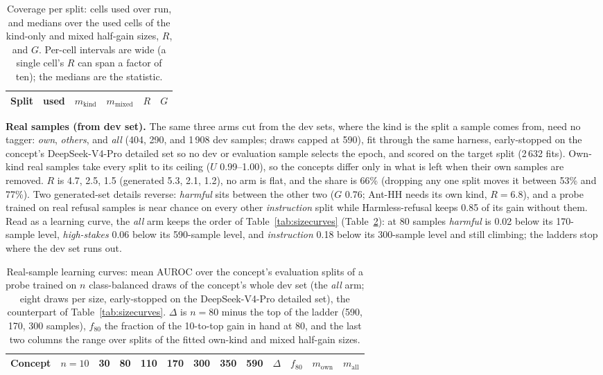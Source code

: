 \documentclass{article} %
\newcommand{\hs}{\emph{high-stakes}}
\newcommand{\harm}{\emph{harmful}}
\newcommand{\instr}{\emph{instruction}}
\begin{document}
\begin{table}[H]
  \caption{Coverage per split: cells used over run, and medians over the used cells of the kind-only and mixed half-gain sizes, $R$, and $G$. Per-cell intervals are wide (a single cell's $R$ can span a factor of ten); the medians are the statistic.}
  \label{tab:dc_splits}
  \centering\small
  \setlength{\tabcolsep}{5pt}
  \begin{tabular}{lccccc}
    \toprule
    Split & used & $m_{\text{kind}}$ & $m_{\text{mixed}}$ & $R$ & $G$ \\
    \midrule
    
  \end{tabular}
\end{table}

\textbf{Real samples (from dev set).} The same three arms cut from the dev sets, where the kind is the split a sample comes from, need no tagger: \emph{own}, \emph{others}, and \emph{all} (404, 290, and 1\,908 dev samples; draws capped at 590), fit through the same harness, early-stopped on the concept's DeepSeek-V4-Pro detailed set so no dev or evaluation sample selects the epoch, and scored on the target split (2\,632 fits). Own-kind real samples take every split to its ceiling ($U$ 0.99--1.00), so the concepts differ only in what is left when their own samples are removed. $R$ is 4.7, 2.5, 1.5 (generated 5.3, 2.1, 1.2), no arm is flat, and the share is 66\% (dropping any one split moves it between 53\% and 77\%). Two generated-set details reverse: \harm{} sits between the other two ($G$ 0.76; Ant-HH needs its own kind, $R=6.8$), and a probe trained on real refusal samples is near chance on every other \instr{} split while Harmless-refusal keeps 0.85 of its gain without them. Read as a learning curve, the \emph{all} arm keeps the order of Table~\ref{tab:sizecurves} (Table~\ref{tab:dc_dev_curves}): at 80 samples \harm{} is 0.02 below its 170-sample level, \hs{} 0.06 below its 590-sample level, and \instr{} 0.18 below its 300-sample level and still climbing; the ladders stop where the dev set runs out.

\begin{table}[H]
  \caption{Real-sample learning curves: mean AUROC over the concept's evaluation splits of a probe trained on $n$ class-balanced draws of the concept's whole dev set (the \emph{all} arm; eight draws per size, early-stopped on the DeepSeek-V4-Pro detailed set), the counterpart of Table~\ref{tab:sizecurves}. $\Delta$ is $n{=}80$ minus the top of the ladder (590, 170, 300 samples), $f_{80}$ the fraction of the 10-to-top gain in hand at 80, and the last two columns the range over splits of the fitted own-kind and mixed half-gain sizes.}
  \label{tab:dc_dev_curves}
  \centering\small
  \setlength{\tabcolsep}{3pt}
  \begin{tabular}{lcccccccccccc}
    \toprule
    Concept & $n{=}10$ & 30 & 80 & 110 & 170 & 300 & 350 & 590 & $\Delta$ & $f_{80}$ & $m_{\text{own}}$ & $m_{\text{all}}$ \\
    \midrule
    
  \end{tabular}
\end{table}
\end{document}

